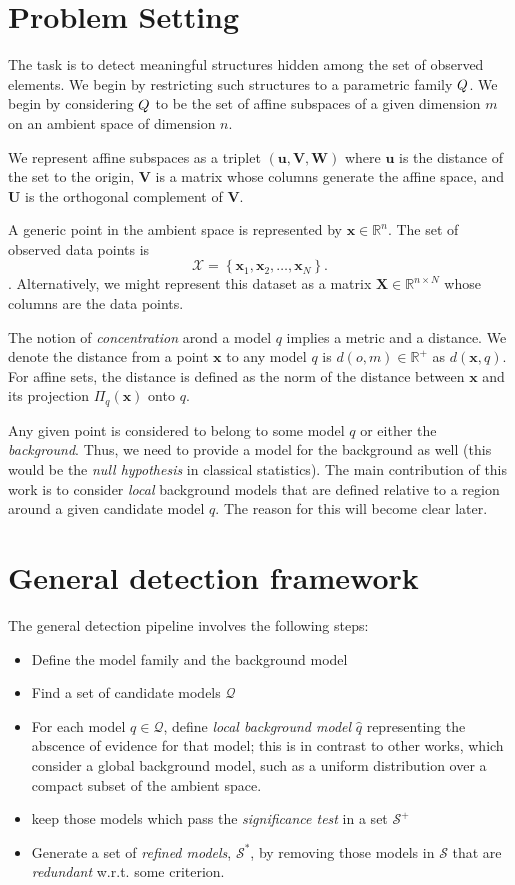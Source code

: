 \documentclass[a4page,11pt]{article}
\renewcommand{\vec}[1]{\mathbf{#1}}%
\newcommand{\mat}[1]{\mathbf{#1}}%
\newcommand{\set}[1]{\mathcal{#1}}%
\newcommand{\setdef}[1]{\left\{#1\right\}}%
\def\opt{^{*}}%
\def\reals{\mathbb{R}}%
\begin{document}
\section{Problem Setting}

The task is to detect meaningful structures hidden among the set of observed elements. We begin by restricting such structures to a parametric family $\space{Q}$. We begin by considering $\space{Q}$ to be the set of affine subspaces of a given dimension $m$ on an ambient space of dimension $n$.

We represent affine subspaces as a triplet $(\vec{u},\mat{V},\mat{W})$ where $\vec{u}$ is the distance of the set to the origin, $\mat{V}$ is a matrix whose columns generate the affine space, and $\mat{U}$ is the orthogonal complement of $\mat{V}$.

A generic point in the ambient space is represented by $\vec{x} \in \reals^n$. The set of observed data points is $$\set{X} = \setdef{ \vec{x}_1,\vec{x}_2,\ldots,\vec{x}_N}.$$. Alternatively, we might represent this dataset as a matrix $\mat{X} \in \reals^{n{\times}N}$ whose columns are the data points.

The notion of \emph{concentration} arond a model $q$ implies a metric and a distance. We denote the distance from a point $\vec{x}$ to any model $q$ is $d(o,m) \in \reals^+$ as $d(\vec{x},q)$. For affine sets, the distance is defined as the norm of the distance between $\vec{x}$ and its projection $\Pi_q(\vec{x})$ onto $q$. 

Any given point is considered to belong to some model $q$ or either the \emph{background}. Thus, we need to provide a model for the background as well (this would be the \emph{null hypothesis} in classical statistics). The main contribution of this work is to consider \emph{local} background models that are defined relative to a region around a given candidate model $q$. The reason for this will become clear later.


\section{General detection framework}

The general detection pipeline involves the following steps:

\begin{itemize}
\item Define the model family and the background model
\item Find a set of candidate models $\set{Q}$
\item For each model $q \in \set{Q}$, define \emph{local background model} $\hat{q}$ representing the abscence of evidence for that model; this is in contrast to other works, which consider a global background model, such as a uniform distribution over a compact subset of the ambient space.
\item keep those models which pass the \emph{significance test} in a set $\set{S}^+$
\item Generate a set of \emph{refined models}, $\set{S}\opt$, by  removing those models in $\set{S}$ that are \emph{redundant} w.r.t. some criterion. 
\end{itemize}
\end{document}
